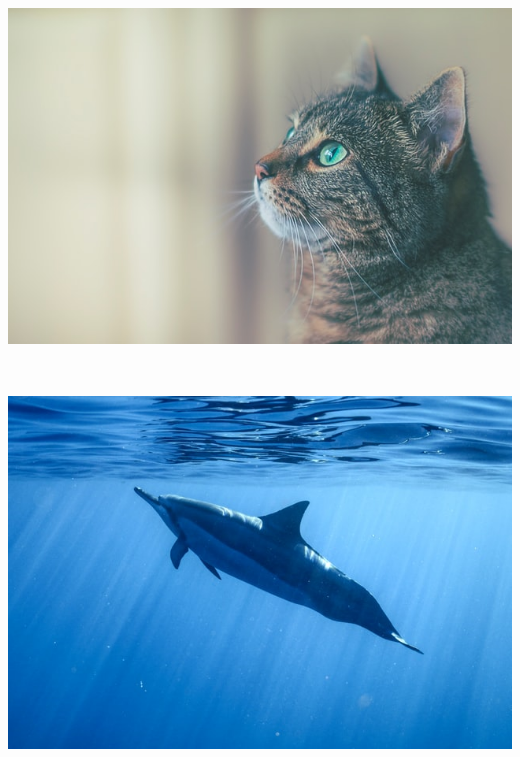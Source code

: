 \documentclass[11pt, a4paper]{article}
\begin{document}
\begin{example}
\begin{gridlayout}{\textwidth}{11cm}
        \begin{row}{0.05}
            \begin{cell}{1}
                ~ 
            \end{cell}
        \end{row}
        \begin{row}{0.3}
            \begin{cell}{0.3}
                \includegraphics[width=\cellwidth, height=\rowheight, keepaspectratio]{img/cat.jpg}
            \end{cell}
            \begin{cell}{0.05}
                ~
            \end{cell}
            \begin{cell}{0.3}
                \includegraphics[width=\cellwidth, height=\rowheight, keepaspectratio]{img/dolphin.jpg}

\end{cell}
\end{row}
\end{gridlayout}
\end{example}
\end{document}
